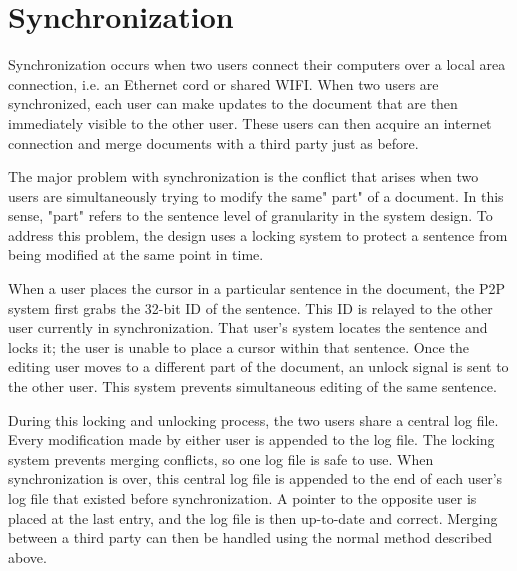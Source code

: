 \section{Synchronization}

Synchronization occurs when two users connect their computers over a local area connection, i.e. an Ethernet cord or shared WIFI. When two users are synchronized, each user can make updates to the document that are then immediately visible to the other user.  These users can then acquire an internet connection and merge documents with a third party just as before.

The major problem with synchronization is the conflict that arises when two users are simultaneously trying to modify the same" part" of a document. In this sense, "part" refers to the sentence level of granularity in the system design. To address this problem, the design uses a locking system to protect a sentence from being modified at the same point in time.

 When a user places the cursor in a particular sentence in the document, the P2P system first grabs the 32-bit ID of the sentence. This ID is relayed to the other user currently in synchronization. That user's system locates the sentence and locks it; the user is unable to place a cursor within that sentence. Once the editing user moves to a different part of the document, an unlock signal is sent to the other user. This system prevents simultaneous editing of the same sentence.

During this locking and unlocking process, the two users share a central log file. Every modification made by either user is appended to the log file. The locking system prevents merging conflicts, so one log file is safe to use. When synchronization is over, this central log file is appended to the end of each user's log file that existed before synchronization. A pointer to the opposite user is placed at the last entry, and the log file is then up-to-date and correct. Merging between a third party can then be handled using the normal method described above. 